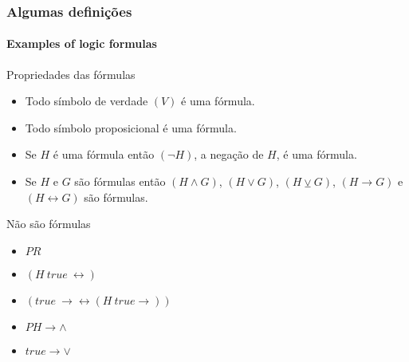 \begin{frame}[t]
    \small
    \frametitle{Algumas definições}
    \framesubtitle{Examples of logic formulas}
    \begin{block}{Propriedades das fórmulas}
        \begin{itemize}
            \item Todo símbolo de verdade $(V)$ é uma fórmula.
            \item Todo símbolo proposicional é uma fórmula.
            \item Se $H$ é uma fórmula então $(\lnot H)$, a negação de $H$, é uma fórmula.
            \item Se $H$ e $G$ são fórmulas então $(H \land G)$, $(H \lor G)$,  $(H \veebar G)$, $(H \rightarrow G)$ e $(H \leftrightarrow G)$ são fórmulas. 
        \end{itemize}
    \end{block}    
    \vspace{-2mm}
    \pause
    \begin{block}{Não são fórmulas}
        \begin{itemize}
            \item $PR$
            \item $(H~true~\leftrightarrow)$
            \item $(true~\rightarrow \leftrightarrow (H~true \rightarrow))$
            \item $PH \rightarrow \land$
            \item $true \rightarrow \lor$
        \end{itemize}
    \end{block}
\end{frame}
%
